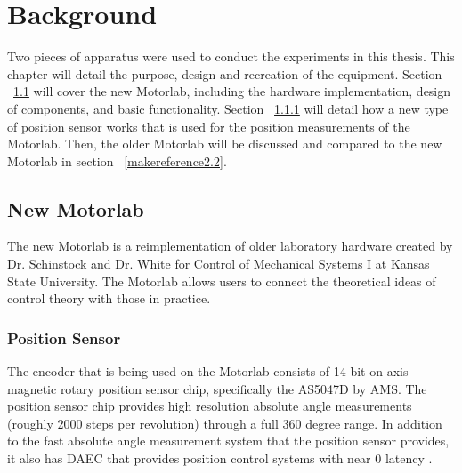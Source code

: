 
\cleardoublepage


\chapter{Background}
\label{makereference2}

Two pieces of apparatus were used to conduct the experiments in this thesis. This chapter will detail the purpose, design and recreation of the equipment. Section ~\ref{makereference2.1} will cover the new Motorlab, including the hardware implementation, design of components, and basic functionality. Section ~\ref{makereference2.1.1} will detail how a new type of position sensor works that is used for the position measurements of the Motorlab. Then, the older Motorlab will be discussed and compared to the new Motorlab in section ~\ref{makereference2.2}.

\section{New Motorlab}
\label{makereference2.1} 

The new Motorlab is a reimplementation of older laboratory hardware created by Dr. Schinstock and Dr. White for Control of Mechanical Systems I at Kansas State University. The Motorlab allows users to connect the theoretical ideas of control theory with those in practice. 


\subsection{Position Sensor}
\label{makereference2.1.1} 


The encoder that is being used on the Motorlab consists of 14-bit on-axis magnetic rotary position sensor chip, specifically the AS5047D by AMS. The position sensor chip provides high resolution absolute angle measurements (roughly 2000 steps per revolution) through a full 360 degree range. In addition to the fast absolute angle measurement system that the position sensor provides, it also has \ac{DAEC} that provides position control systems with near 0 latency \citep{1}.  


